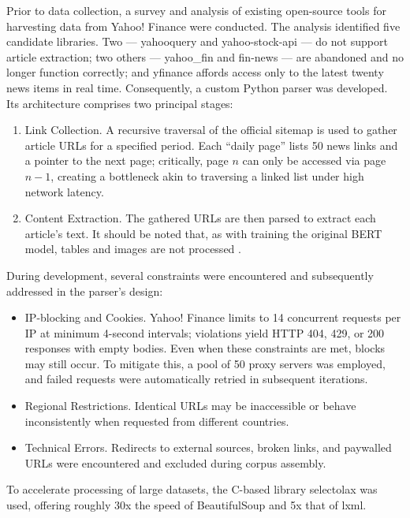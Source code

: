 Prior to data collection, a survey and analysis of existing open-source tools for harvesting data from Yahoo! Finance were conducted.
The analysis identified five candidate libraries. Two --- yahooquery and yahoo-stock-api --- do not support article extraction;
two others --- yahoo\_fin and fin-news --- are abandoned and no longer function correctly; and yfinance affords access only
to the latest twenty news items in real time. Consequently, a custom Python parser was developed. Its architecture comprises
two principal stages:

\begin{enumerate}
    \item Link Collection. A recursive traversal of the official sitemap is used to gather article URLs for a specified
    period. Each “daily page” lists 50 news links and a pointer to the next page; critically, page $n$ can only be accessed
    via page $n - 1$, creating a bottleneck akin to traversing a linked list under high network latency.
    \item Content Extraction. The gathered URLs are then parsed to extract each article's text. It should be noted that,
    as with training the original BERT model, tables and images are not processed \parencite{devlin2019BERT}.
\end{enumerate}

During development, several constraints were encountered and subsequently addressed in the parser's design:

\begin{itemize}
    \item IP-blocking and Cookies. Yahoo! Finance limits to 14 concurrent requests per IP at minimum 4-second intervals;
    violations yield HTTP 404, 429, or 200 responses with empty bodies. Even when these constraints are met, blocks may
    still occur. To mitigate this, a pool of 50 proxy servers was employed, and failed requests were automatically retried
    in subsequent iterations.
    \item Regional Restrictions. Identical URLs may be inaccessible or behave inconsistently when requested from different
    countries.
    \item Technical Errors. Redirects to external sources, broken links, and paywalled URLs were encountered and excluded
    during corpus assembly.
\end{itemize}

To accelerate processing of large datasets, the C-based library selectolax was used, offering roughly 30x the speed
of BeautifulSoup and 5x that of lxml.

